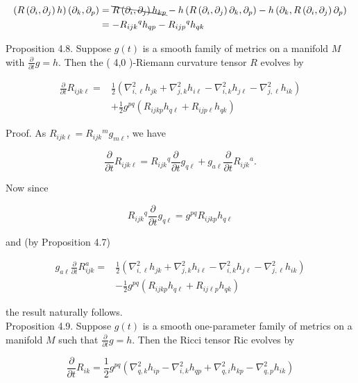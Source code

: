\documentclass[10pt, letterpaper]{article}
\begin{document}
$$
\begin{aligned}
\left(R\left(\partial_{i}, \partial_{j}\right) h\right)\left(\partial_{k}, \partial_{p}\right) & =\bcancel{R\left(\partial_{i}, \partial_{j}\right) h_{k p}}-h\left(R\left(\partial_{i}, \partial_{j}\right) \partial_{k}, \partial_{p}\right)-h\left(\partial_{k}, R\left(\partial_{i}, \partial_{j}\right) \partial_{p}\right) \\
& =-R_{i j k}{ }^{q} h_{q p}-R_{i j p}{ }^{q} h_{q k}
\end{aligned}
$$

Proposition 4.8. Suppose $g(t)$ is a smooth family of metrics on a manifold $M$ with $\frac{\partial}{\partial t} g=h$. Then the ( 4,0 )-Riemann curvature tensor $R$ evolves by

$$
\begin{aligned}
\frac{\partial}{\partial t} R_{i j k \ell}= & \frac{1}{2}\left(\nabla_{i, \ell}^{2} h_{j k}+\nabla_{j, k}^{2} h_{i \ell}-\nabla_{i, k}^{2} h_{j \ell}-\nabla_{j, \ell}^{2} h_{i k}\right) \\
& +\frac{1}{2} g^{p q}\left(R_{i j k p} h_{q \ell}+R_{i j p \ell} h_{q k}\right)
\end{aligned}
$$

Proof. As $R_{i j k \ell}=R_{i j k}{ }^{m} g_{m \ell}$, we have

$$
\frac{\partial}{\partial t} R_{i j k \ell}=R_{i j k}{ }^{q} \frac{\partial}{\partial t} g_{q \ell}+g_{a \ell} \frac{\partial}{\partial t} R_{i j k}{ }^{a} .
$$

Now since

$$
R_{i j k}{ }^{q} \frac{\partial}{\partial t} g_{q \ell}=g^{p q} R_{i j k p} h_{q \ell}
$$

and (by Proposition 4.7)

$$
\begin{aligned}
g_{a \ell} \frac{\partial}{\partial t} R_{i j k}^{a}= & \frac{1}{2}\left(\nabla_{i, \ell}^{2} h_{j k}+\nabla_{j, k}^{2} h_{i \ell}-\nabla_{i, k}^{2} h_{j \ell}-\nabla_{j, \ell}^{2} h_{i k}\right) \\
& -\frac{1}{2} g^{p q}\left(R_{i j k p} h_{q \ell}+R_{i j \ell p} h_{q k}\right)
\end{aligned}
$$

the result naturally follows.\\
Proposition 4.9. Suppose $g(t)$ is a smooth one-parameter family of metrics on a manifold $M$ such that $\frac{\partial}{\partial t} g=h$. Then the Ricci tensor Ric evolves by

$$
\frac{\partial}{\partial t} R_{i k}=\frac{1}{2} g^{p q}\left(\nabla_{q, k}^{2} h_{i p}-\nabla_{i, k}^{2} h_{q p}+\nabla_{q, i}^{2} h_{k p}-\nabla_{q, p}^{2} h_{i k}\right)
$$
\end{document}
